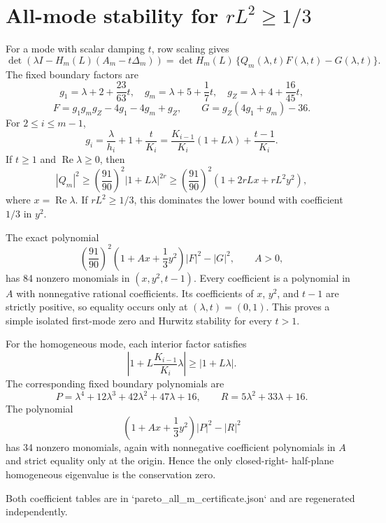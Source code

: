 \section*{All-mode stability for $rL^2\ge1/3$}
For a mode with scalar damping $t$, row scaling gives
\[
 \det(\lambda I-H_m(L)(A_m-t\Delta_m))
 =\det H_m(L)\,\{Q_m(\lambda,t)F(\lambda,t)-G(\lambda,t)\}.
\]
The fixed boundary factors are
\[
 g_1=\lambda+2+\frac{23}{63}t,
 \quad g_m=\lambda+5+\frac17t,
 \quad g_Z=\lambda+4+\frac{16}{45}t,
\]
\[
 F=g_1g_mg_Z-4g_1-4g_m+g_Z,
 \qquad G=g_Z(4g_1+g_m)-36.
\]
For $2\le i\le m-1$,
\[
 g_i=\frac{\lambda}{h_i}+1+\frac{t}{K_i}
 =\frac{K_{i-1}}{K_i}(1+L\lambda)+\frac{t-1}{K_i}.
\]
If $t\ge1$ and $\operatorname{Re}\lambda\ge0$, then
\[
 |Q_m|^2\ge\left(\frac{91}{90}\right)^2|1+L\lambda|^{2r}
 \ge\left(\frac{91}{90}\right)^2
 \left(1+2rLx+rL^2y^2\right),
\]
where $x=\operatorname{Re}\lambda$.  If $rL^2\ge1/3$, this dominates the
lower bound with coefficient $1/3$ in $y^2$.

The exact polynomial
\[
 \left(\frac{91}{90}\right)^2
 \left(1+A x+\frac13y^2\right)|F|^2-|G|^2,
 \qquad A>0,
\]
has 84 nonzero monomials in $(x,y^2,t-1)$.  Every coefficient is a
polynomial in $A$ with nonnegative rational coefficients.  Its coefficients
of $x$, $y^2$, and $t-1$ are strictly positive, so equality occurs only at
$(\lambda,t)=(0,1)$.  This proves a simple isolated first-mode zero and
Hurwitz stability for every $t>1$.

For the homogeneous mode, each interior factor satisfies
\[
 \left|1+L\frac{K_{i-1}}{K_i}\lambda\right|
 \ge|1+L\lambda|.
\]
The corresponding fixed boundary polynomials are
\[
 P=\lambda^4+12\lambda^3+42\lambda^2+47\lambda+16,
 \qquad R=5\lambda^2+33\lambda+16.
\]
The polynomial
\[
 \left(1+A x+\frac13y^2\right)|P|^2-|R|^2
\]
has 34 nonzero monomials, again with nonnegative coefficient polynomials in
$A$ and strict equality only at the origin.  Hence the only closed-right-
half-plane homogeneous eigenvalue is the conservation zero.

Both coefficient tables are in `pareto_all_m_certificate.json` and are
regenerated independently.
